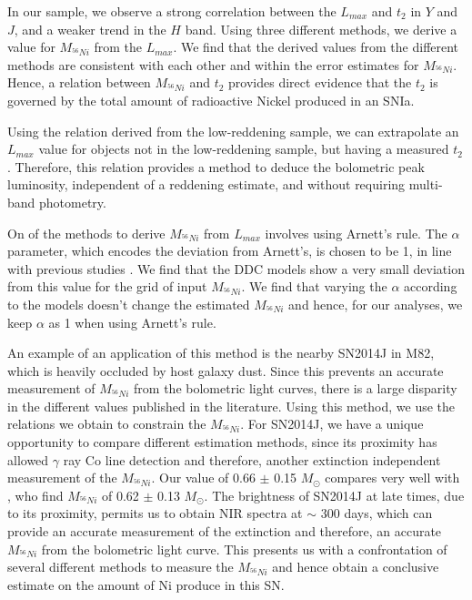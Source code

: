 In our sample, we observe a strong correlation between the $L_{max}$ and $t_2$ in $Y$ and $J$, and a weaker trend in the $H$ band. 
Using three different methods, we derive a value for $M_{^{56}Ni}$ from the $L_{max}$. We find that the derived values from the different methods are consistent with each other and within the error estimates for $M_{^{56}Ni}$. Hence, a relation between $M_{^{56}Ni}$ and $t_2$ provides direct evidence that the $t_2$ is governed by the total amount of radioactive Nickel produced in an SNIa.


Using the relation derived from the low-reddening sample, we can extrapolate an $L_{max}$ value for objects not in the low-reddening sample, but having a measured $t_2$. Therefore, this relation provides a method to deduce the bolometric peak luminosity, independent of a reddening estimate, and without requiring multi-band photometry.

On of the methods to derive $M_{^{56}Ni}$ from $L_{max}$ involves using Arnett's rule. The $\alpha$ parameter, which encodes the deviation from Arnett's, is chosen to be 1, in line with previous studies \citep[eg.][]{Stritzinger2006, Mazzali2007}. We find that the DDC models show a very small deviation from this value for the grid of input $M_{^{56}Ni}$. We find that varying the $\alpha$ according to the models doesn't change the estimated $M_{^{56}Ni}$ and hence, for our analyses, we keep $\alpha$ as 1 when using Arnett's rule.  


An example of an application of this method is the nearby SN2014J in M82, which is heavily occluded by host galaxy dust. Since this prevents 
an accurate measurement of $M_{^{56}Ni}$ from the bolometric light curves, there is a large disparity in the different values published in the literature.
Using this method, we use the relations we obtain to constrain the $M_{^{56}Ni}$. For SN2014J, we have a unique opportunity to compare different estimation methods, 
since its proximity has allowed $\gamma$ ray Co line detection and therefore, another extinction independent measurement of the $M_{^{56}Ni}$. Our value of 0.66 $\pm$ 0.15 $M_{\odot}$
compares very well with \citet{Churazov2014}, who find $M_{^{56}Ni}$ of 0.62 $\pm$ 0.13 $M_{\odot}$.   The brightness of SN2014J at late times, due to its proximity, permits us to obtain
NIR spectra at $\sim$ 300 days, which can provide an accurate measurement of the extinction and therefore, an accurate $M_{^{56}Ni}$ from the bolometric light curve. This presents
us with a confrontation of several different methods to measure the $M_{^{56}Ni}$ and hence obtain a conclusive estimate on the amount of Ni produce in this SN.

